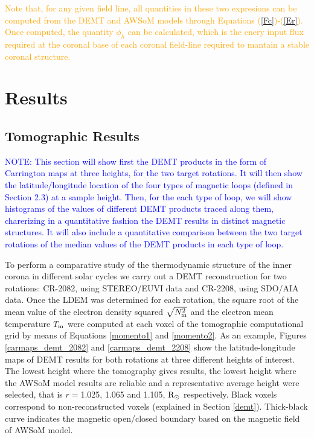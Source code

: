 \documentclass[namedreferences]{solarphysics}
\newcommand{\mrsun}{{\rm R_\odot}}
\newcommand{\Tm}{T_{\rm m}}
\newcommand{\Nsqm}{N^2_{{\rm m}}}
\newcommand{\sqravgN}{\sqrt{\Nsqm}}
\def\albert#1{\textcolor{orange}{#1}}
\def\notebyalbert#1{\textcolor{blue}{NOTE: #1}}
\begin{document}
\begin{article}
\albert{Note that, for any given field line, all quantities in these two expresions can be computed from the DEMT and AWSoM models through Equations (\ref{Fc})-(\ref{Er}). Once computed, the quantity $\phi_h$ can be calculated, which is the enery input flux required at the coronal base of each coronal field-line required to mantain a stable coronal structure.}


\section{Results}\label{resu} 

\subsection{Tomographic Results}\label{demt_res} 

\noindent\notebyalbert{This section will show first the DEMT products in the form of Carrington maps at three heights, for the two target rotations. It will then show the latitude/longitude location of the four types of  magnetic loops (defined in Section 2.3) at a sample height. Then, for the each type of loop, we will show histograms of the values of different DEMT products traced along them, charerizing in a quantitative fashion the DEMT results in distinct magnetic structures. It will also include a quantitative comparison between the two target rotations of the median values of the DEMT products in each type of loop.}

{To perform a comparative study of the thermodynamic structure of the inner corona in different solar cycles
we carry out a DEMT reconstruction for two rotations: CR-2082, using STEREO/EUVI data and CR-2208, using SDO/AIA data.} {Once the LDEM was determined for each rotation, the square root of the mean value of the electron density squared $\sqravgN$ and the electron mean temperature $\Tm$ were computed at each voxel of the tomographic computational grid by means of Equations \ref{momento1} and \ref{momento2}.} As an example, Figures \ref{carmaps_demt_2082} and \ref{carmaps_demt_2208} show the latitude-longitude maps of DEMT results for both rotations at {three different heights of interest. The lowest height where the tomography gives results, the lowest height where the AWSoM model results are reliable and a representative average height were selected, that is $r=$1.025, 1.065 and 1.105, $\mrsun$ respectively}. Black voxels correspond to non-reconstructed voxels (explained in Section \ref{demt}). Thick-black curve indicates the magnetic open/closed boundary based on the magnetic field of AWSoM model. 



\end{article}
\end{document}
